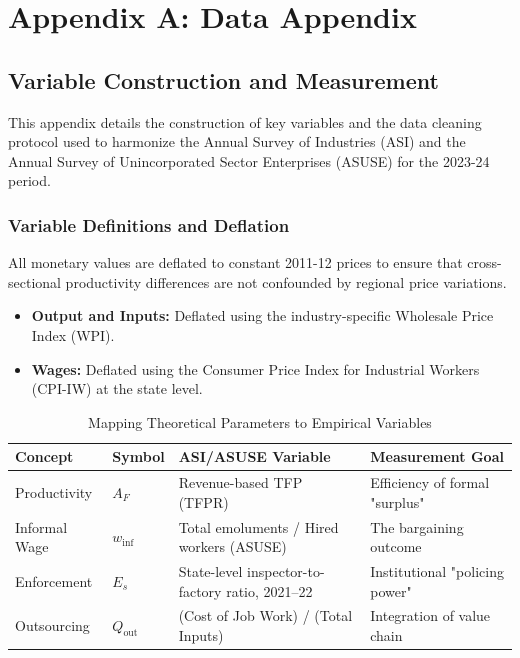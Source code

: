 \chapter{Appendix A: Data Appendix}
\label{appendixA}

\section{Variable Construction and Measurement}

This appendix details the construction of key variables and the data cleaning protocol used to harmonize the Annual Survey of Industries (ASI) and the Annual Survey of Unincorporated Sector Enterprises (ASUSE) for the 2023-24 period.

\subsection{Variable Definitions and Deflation}

All monetary values are deflated to constant 2011-12 prices to ensure that cross-sectional productivity differences are not confounded by regional price variations.

\begin{itemize}
	\item \textbf{Output and Inputs:} Deflated using the industry-specific Wholesale Price Index (WPI).
	\item \textbf{Wages:} Deflated using the Consumer Price Index for Industrial Workers (CPI-IW) at the state level.
\end{itemize}

\begin{table}[ht]
	\centering
	\caption{Mapping Theoretical Parameters to Empirical Variables}
	\label{tab:variable_mapping}
	\begin{tabular}{p{3cm}p{1.5cm}p{5cm}p{4.5cm}}
		\toprule
		\textbf{Concept} & \textbf{Symbol} & \textbf{ASI/ASUSE Variable} & \textbf{Measurement Goal} \\ 
		\midrule
		Productivity & $A_F$ & Revenue-based TFP (TFPR) & Efficiency of formal "surplus" \\ 
		Informal Wage & $w_{\text{inf}}$ & Total emoluments / Hired workers (ASUSE) & The bargaining outcome \\ 
		Enforcement & $E_s$ & State-level inspector-to-factory ratio, 2021--22 & Institutional "policing power" \\ 
		Outsourcing & $Q_{\text{out}}$ & (Cost of Job Work) / (Total Inputs) & Integration of value chain \\ 
		\bottomrule
	\end{tabular}
\end{table}

